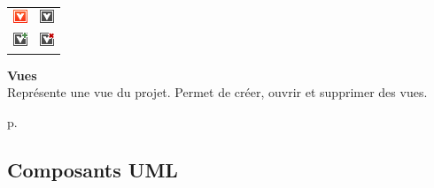 \begin{minipage}[c]{.2\textwidth}
    \begin{rightborder}\begin{tabular}{cc}
		\includegraphics{images/icon/element-view.png} &
		\includegraphics{images/icon/element-view-open.png} \\
		\includegraphics{images/icon/element-view-add.png} &
		\includegraphics{images/icon/element-view-delete.png} \\
    \end{tabular}\end{rightborder}
\end{minipage}
\begin{minipage}[c]{.1\textwidth}\end{minipage}
\begin{minipage}[c]{.6\textwidth}
    \textbf{Vues} \\
    Représente une vue du projet. Permet de créer, ouvrir et supprimer des vues.
\end{minipage}
\begin{minipage}[c]{.1\textwidth}
    \hfill
    p.{\LARGE \pageref{sec:vues}}
\end{minipage}

\subsection*{Composants UML}

